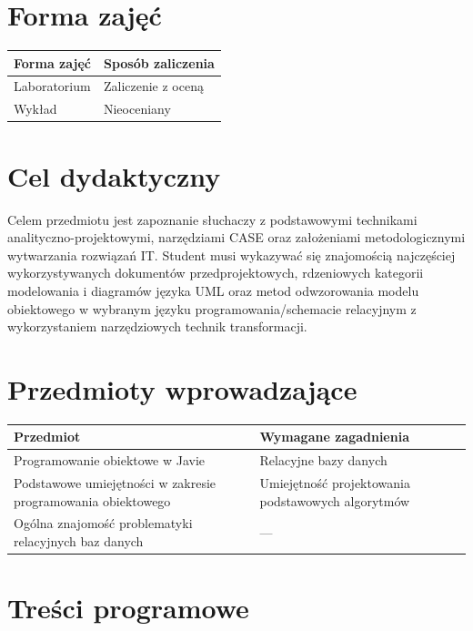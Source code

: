 \documentclass[12pt, a4paper]{article}
\begin{document}
\section{Forma zajęć}

\begin{tabular}{ll}
  \hline
  \textbf{Forma zajęć} & \textbf{Sposób zaliczenia} \\
  \hline
  Laboratorium & Zaliczenie z oceną \\
  Wykład & Nieoceniany \\
  \hline
\end{tabular}

\section{Cel dydaktyczny}

Celem przedmiotu jest zapoznanie słuchaczy z podstawowymi technikami analityczno-projektowymi, narzędziami CASE oraz założeniami metodologicznymi wytwarzania rozwiązań IT. Student musi wykazywać się znajomością najczęściej wykorzystywanych dokumentów przedprojektowych, rdzeniowych kategorii modelowania i diagramów języka UML oraz metod odwzorowania modelu obiektowego w wybranym języku programowania/schemacie relacyjnym z wykorzystaniem narzędziowych technik transformacji.

\section{Przedmioty wprowadzające}

\begin{tabularx}{\textwidth}{lX}
  \hline
  \textbf{Przedmiot} & \textbf{Wymagane zagadnienia} \\
  \hline
  Programowanie obiektowe w Javie & Relacyjne bazy danych \\
  Podstawowe umiejętności w zakresie programowania obiektowego & Umiejętność projektowania podstawowych algorytmów \\
  Ogólna znajomość problematyki relacyjnych baz danych & --- \\
  \hline
\end{tabularx}

\section{Treści programowe}
\end{document}
